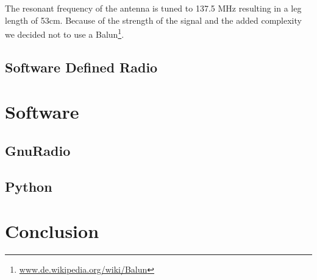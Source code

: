 \documentclass[11pt]{article}
\begin{document}
The resonant frequency of the antenna is tuned to 137.5 MHz resulting in a leg length of 53cm. Because of the strength of the signal and the added complexity we decided not to use a Balun\footnote{\href{https://de.wikipedia.org/wiki/Balun}{www.de.wikipedia.org/wiki/Balun}}.

\subsection{Software Defined Radio}

\section{Software}
\subsection{GnuRadio}
\subsection{Python}

\section{Conclusion}


\cite{Nebarnix:2016}

\newpage

 

\end{document}
